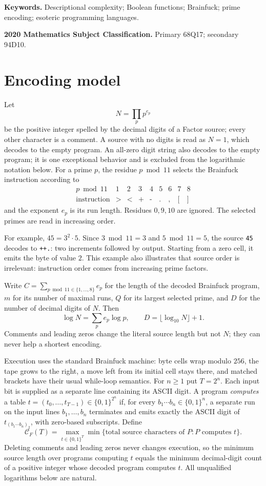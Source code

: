 \documentclass[11pt]{article}
\theoremstyle{remark}
\newcommand{\CF}{\mathcal C_F}
\begin{document}
\noindent\textbf{Keywords.} Descriptional complexity; Boolean functions;
Brainfuck; prime encoding; esoteric programming languages.

\noindent\textbf{2020 Mathematics Subject Classification.} Primary 68Q17;
secondary 94D10.

\section{Encoding model}

Let
\[
  N=\prod_p p^{e_p}
\]
be the positive integer spelled by the decimal digits of a Factor source;
every other character is a comment.  A source with no digits is read as
$N=1$, which decodes to the empty program.  An all-zero digit string also
decodes to the empty program; it is one exceptional behavior and is excluded
from the logarithmic notation below.
For a prime $p$, the residue $p\bmod 11$ selects the Brainfuck instruction
according to
\[
\begin{array}{c|cccccccc}
p\bmod 11&1&2&3&4&5&6&7&8\\ \hline
\text{instruction}&\texttt{>}&\texttt{<}&\texttt{+}&\texttt{-}
  &\texttt{.}&\texttt{,}&\texttt{[}&\texttt{]}
\end{array}
\]
and the exponent $e_p$ is its run length.  Residues $0,9,10$ are ignored.
The selected primes are read in increasing order.

For example, $45=3^2\cdot5$.  Since $3\bmod11=3$ and
$5\bmod11=5$, the source \texttt{45} decodes to \texttt{++.}: two
increments followed by output.  Starting from a zero cell, it emits the byte
of value $2$.  This example also illustrates that source order is irrelevant:
instruction order comes from increasing prime factors.

Write $C=\sum_{p\bmod 11\in\{1,\ldots,8\}}e_p$ for the length of the decoded
Brainfuck program, $m$ for its number of maximal runs, $Q$ for its largest
selected prime, and $D$ for the number of decimal digits of $N$.  Then
\begin{equation}\label{eq:digits}
  \log N=\sum_p e_p\log p,
  \qquad D=\lfloor\log_{10}N\rfloor+1.
\end{equation}
Comments and leading zeros change the literal source length but not $N$;
they can never help a shortest encoding.

Execution uses the standard Brainfuck machine: byte cells wrap modulo $256$,
the tape grows to the right, a move left from its initial cell stays there,
and matched brackets have their usual while-loop semantics.  For $n\ge1$ put
$T=2^n$.  Each input bit is supplied as a separate line containing its ASCII
digit.  A program
\emph{computes} a table $t=(t_0,\ldots,t_{T-1})\in\{0,1\}^{2^n}$ if, for every
$b_1\cdots b_n\in\{0,1\}^n$, a separate run on the input lines
$b_1,\ldots,b_n$ terminates and emits exactly the ASCII digit of
$t_{(b_1\cdots b_n)_2}$, with zero-based subscripts.
Define
\[
 \CF(T)=\max_{t\in\{0,1\}^T}
 \min\{\text{total source characters of }P:P\text{ computes }t\}.
\]
Deleting comments and leading zeros never changes execution, so the minimum
source length over programs computing $t$ equals the minimum decimal-digit
count of a positive integer whose decoded program computes $t$.  All
unqualified logarithms below are natural.
\end{document}
